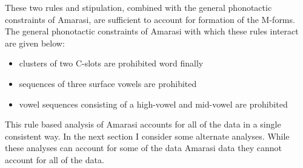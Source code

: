 These two rules and stipulation,
combined with the general phonotactic constraints of Amarasi,
are sufficient to account for formation of the M-forms.
The general phonotactic constraints of Amarasi with which these rules
interact are given below:

\begin{itemize}
	\item clusters of two C-slots are prohibited word finally
	\item sequences of three surface vowels are prohibited
	\item vowel sequences consisting of a high-vowel and mid-vowel are prohibited
\end{itemize}

This rule based analysis of Amarasi accounts for
all of the data in a single consistent way.
In the next section I consider some alternate analyses.
While these analyses can account for some of the data Amarasi data
they cannot account for all of the data.
